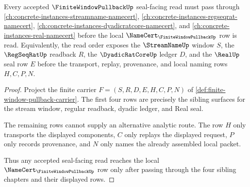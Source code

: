 \begin{theorem}
\label{thm:finite-window-pullback-streamname-route}
Every accepted $\FiniteWindowPullbackUp$ seal-facing read must pass through \autoref{ch:concrete-instances-streamname-namecert}, \autoref{ch:concrete-instances-regseqrat-namecert}, \autoref{ch:concrete-instances-dyadicratcore-namecert}, and \autoref{ch:concrete-instances-real-namecert} before the local $\NameCert_{\FiniteWindowPullbackUp}$ row is read. Equivalently, the read order exposes the $\StreamNameUp$ window $S$, the $\RegSeqRatUp$ readback $R$, the $\DyadicRatCoreUp$ ledger $D$, and the $\RealUp$ seal row $E$ before the transport, replay, provenance, and local naming rows $H,C,P,N$.
\end{theorem}
\begin{proof}
Project the finite carrier $F=(S,R,D,E,H,C,P,N)$ of \autoref{def:finite-window-pullback-carrier}. The first four rows are precisely the sibling surfaces for the stream window, regular readback, dyadic ledger, and Real seal.

The remaining rows cannot supply an alternative analytic route. The row $H$ only transports the displayed components, $C$ only replays the displayed request, $P$ only records provenance, and $N$ only names the already assembled local packet.

Thus any accepted seal-facing read reaches the local $\NameCert_{\FiniteWindowPullbackUp}$ row only after passing through the four sibling chapters and their displayed rows.
\end{proof}




